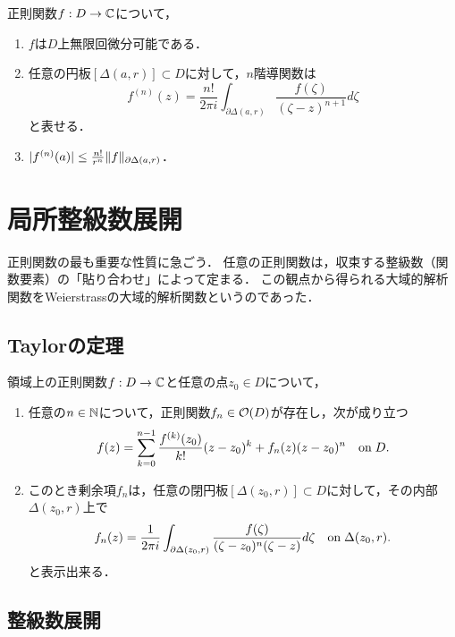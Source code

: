 \documentclass[uplatex, dvipdfmx]{jsreport}
\begin{document}
\begin{theorem}
    正則関数$f:D\to\mathbb{C}$について，
    \begin{enumerate}
        \item $f$は$D$上無限回微分可能である．
        \item 任意の円板$[\Delta(a,r)]\subset D$に対して，$n$階導関数は
        \[f^{(n)}(z)=\frac{n!}{2\pi i}\int_{\partial\Delta(a,r)}\frac{f(\zeta)}{(\zeta-z)^{n+1}}d\zeta\]
        と表せる．
        \item $\lvert f^{(n)}(a)\rvert\le\frac{n!}{r^n}\|f\|_{\partial\Delta(a,r)}$．
    \end{enumerate}
\end{theorem}

\section{局所整級数展開}

\begin{tcolorbox}[colframe=ForestGreen, colback=ForestGreen!10!white,breakable,colbacktitle=ForestGreen!40!white,coltitle=black,fonttitle=\bfseries\sffamily,
title=]
    正則関数の最も重要な性質に急ごう．
    任意の正則関数は，収束する整級数（関数要素）の「貼り合わせ」によって定まる．
    この観点から得られる大域的解析関数をWeierstrassの大域的解析関数というのであった．
\end{tcolorbox}

\subsection{Taylorの定理}

\begin{theorem}[Taylorの定理]
    領域上の正則関数$f:D\to\mathbb{C}$と任意の点$z_0\in D$について，
    \begin{enumerate}
        \item 任意の$n\in\mathbb{N}$について，正則関数$f_n\in\mathcal{O}(D)$が存在し，次が成り立つ
        \[f(z)=\sum^{n-1}_{k=0}\frac{f^{(k)}(z_0)}{k!}(z-z_0)^k+f_n(z)(z-z_0)^n\quad\mathrm{on}\; D.\]
        \item このとき剰余項$f_n$は，任意の閉円板$[\Delta(z_0,r)]\subset D$に対して，その内部$\Delta(z_0,r)$上で
        \[f_n(z)=\frac{1}{2\pi i}\int_{\partial\Delta(z_0,r)}\frac{f(\zeta)}{(\zeta-z_0)^n(\zeta-z)}d\zeta\quad\mathrm{on}\;\Delta(z_0,r).\]
        と表示出来る．
    \end{enumerate}
\end{theorem}

\subsection{整級数展開}
\end{document}

